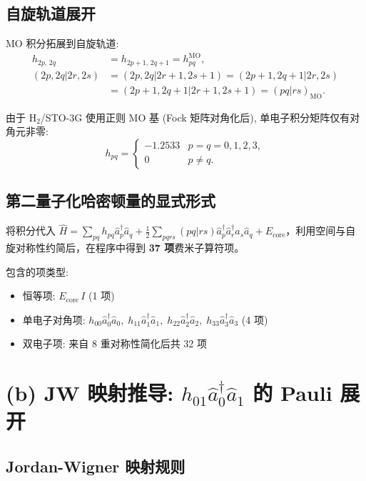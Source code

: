 \documentclass[fontset=mac]{ctexart}
\newcommand{\adag}[1]{\hat{a}_{#1}^\dagger}
\newcommand{\aop}[1]{\hat{a}_{#1}}
\begin{document}
\subsection*{自旋轨道展开}

MO 积分拓展到自旋轨道:
\begin{align}
    h_{2p,\,2q} &= h_{2p+1,\,2q+1} = h_{pq}^{\text{MO}}, \\
    (2p,2q|2r,2s) &= (2p,2q|2r\!+\!1,2s\!+\!1)
                     = (2p\!+\!1,2q\!+\!1|2r,2s) \nonumber\\
                   &= (2p\!+\!1,2q\!+\!1|2r\!+\!1,2s\!+\!1) = (pq|rs)_{\text{MO}} .
\end{align}

由于 H$_2$/STO-3G 使用正则 MO 基 (Fock 矩阵对角化后), 单电子积分矩阵仅有对角元非零:
\begin{equation}
    h_{pq} = \begin{cases}
        -1.2533 & p=q=0,1,2,3, \\
        0       & p\neq q.
    \end{cases}
\end{equation}

\subsection*{第二量子化哈密顿量的显式形式}

将积分代入 $\hat{H} = \sum_{pq} h_{pq} \adag{p} \aop{q}
+ \frac{1}{2} \sum_{pqrs} (pq|rs) \adag{p} \adag{r} \aop{s} \aop{q}
+ E_{\text{core}}$，利用空间与自旋对称性约简后，在程序中得到 \textbf{37 项}费米子算符项。

包含的项类型:
\begin{itemize}
    \item 恒等项: $E_{\text{core}}\, I$ (1 项)
    \item 单电子对角项: $h_{00}\adag{0}\aop{0},\; h_{11}\adag{1}\aop{1},\; h_{22}\adag{2}\aop{2},\; h_{33}\adag{3}\aop{3}$ (4 项)
    \item 双电子项: 来自 8 重对称性简化后共 32 项
\end{itemize}

\section*{(b) JW 映射推导: $h_{01}\adag{0}\aop{1}$ 的 Pauli 展开}

\subsection*{Jordan-Wigner 映射规则}
\end{document}
